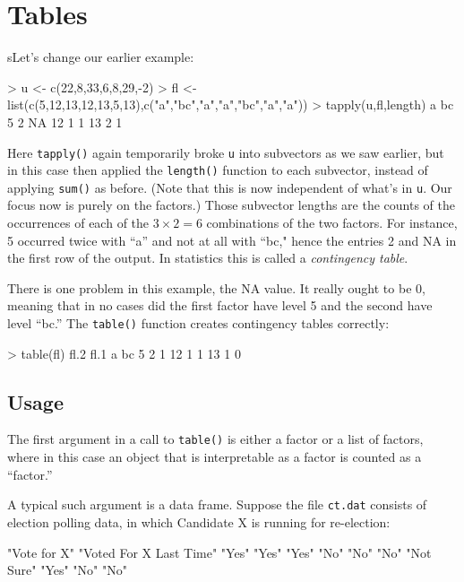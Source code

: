 \section{Tables}
\label{tables}

sLet's change our earlier example:

\begin{Code}
> u <- c(22,8,33,6,8,29,-2)
> fl <- list(c(5,12,13,12,13,5,13),c("a","bc","a","a","bc","a","a"))
> tapply(u,fl,length)
   a bc
5  2 NA
12 1  1
13 2  1

\end{Code}

Here {\tt tapply()} again temporarily broke {\tt u} into subvectors as
we saw earlier, but in this case then applied the {\tt length()}
function to each subvector, instead of applying {\tt sum()} as before.
(Note that this is now independent of what's in {\tt u}.  Our focus now
is purely on the factors.) Those subvector lengths are the counts of the
occurrences of each of the $3 \times 2 = 6$ combinations of the two
factors.  For instance, 5 occurred twice with ``a'' and not at all with
``bc," hence the entries 2 and NA in the first row of the output.  In
statistics this is called a {\it contingency table}.

There is one problem in this example, the NA value.  It really ought to
be 0, meaning that in no cases did the first factor have level 5 and
the second have level ``bc.''  The {\tt table()} function creates
contingency tables correctly:

\begin{Code}
> table(fl)
    fl.2
fl.1 a bc
  5  2  1
  12 1  1
  13 1  0
\end{Code}


\subsection{Usage}
\label{tableusage}

The first argument in a call to {\tt table()} is either a factor or a
list of factors, where in this case an object that is interpretable as a
factor is counted as a ``factor.''  

A typical such argument is a data frame.  Suppose the file {\tt ct.dat}
consists of election polling data, in which Candidate X is running for
re-election:

\begin{Code}
"Vote for X" "Voted For X Last Time"
"Yes" "Yes"
"Yes" "No"
"No" "No"
"Not Sure" "Yes"
"No" "No"
\end{Code}

